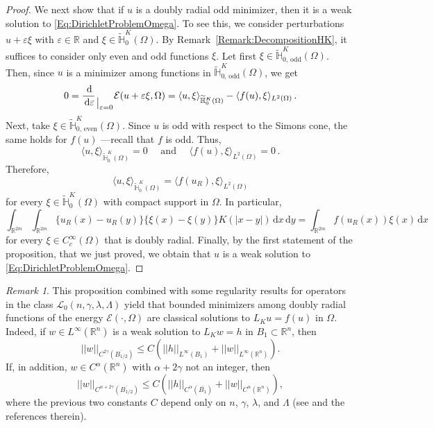 \documentclass[12pt,reqno]{amsart}
\theoremstyle{definition}
\theoremstyle{remark}
\newtheorem{remark}[theorem]{Remark}
\newcommand{\con}[1]{\mathbb{#1}}
\newcommand{\R}{\con{R}} %
\renewcommand{\H}{\con{H}}
\newcommand{\ecal}{\mathcal{E}}
\newcommand{\lcal}{\mathcal{L}}
\newcommand{\norm}[1]{\left | \left |{#1} \right | \right |}
\newcommand{\s}{\gamma}
\renewcommand{\d}{\,\mathrm{d}} %
\newcommand{\bpar}[1]{\left ( {#1}\right )}
\newcommand\evalat[1]{_{\mkern1.5mu\big\vert_{\scriptstyle #1}}}
\numberwithin{equation}{section}
\begin{document}
\begin{proof}
	
	We next show that if $u$ is a doubly radial odd minimizer, then it is a weak solution to \eqref{Eq:DirichletProblemOmega}. To see this, we consider perturbations $u +  \varepsilon \xi$ with $\varepsilon\in \R$ and $\xi \in \widetilde{\H}^K_{0}(\Omega)$. By Remark~\ref{Remark:DecompositionHK}, it suffices to consider only even and odd functions $\xi$. Let first $\xi \in \widetilde{\H}^K_{0, \,\mathrm{odd}}(\Omega)$. Then, since $u$ is a minimizer among functions in $\widetilde{\H}^K_{0, \,\mathrm{odd}}(\Omega)$, we get
	$$
	0 = \dfrac{\d}{\d \varepsilon}\evalat{\varepsilon = 0} \ecal(u +  \varepsilon \xi, \Omega) = \langle u,\xi \rangle_{\widetilde{\H}^K_0(\Omega)} - \langle f(u),\xi \rangle_{L^2(\Omega)}\,.
	$$
	Next, take $\xi \in \widetilde{\H}^K_{0, \,\mathrm{even}}(\Omega)$. Since $u$ is odd with respect to the Simons cone, the same holds for $f(u)$ ---recall that $f$ is odd. Thus,
	$$
	\langle u,\xi \rangle_{\widetilde{\H}^K_0(\Omega)} = 0 \quad \textrm{ and } \quad  \langle f(u),\xi \rangle_{L^2(\Omega)} = 0\,.
	$$
	Therefore, 
	$$
	\langle u,\xi \rangle_{\widetilde{\H}^K_0(\Omega)} = \langle f(u_R),\xi \rangle_{L^2(\Omega)}
	$$
	for every $\xi \in\widetilde{\H}^K_0(\Omega)$ with compact support in  $\Omega$. In particular,
	$$
	\int_{\R^{2m}}\int_{\R^{2m}} \{u_R(x)-u_R(y)\}\{\xi(x)-\xi(y)\} K(|x-y|) \d x \d y = \int_{\R^{2m}} f(u_R(x)) \xi(x) \d x
	$$
	for every $\xi \in C^\infty_c(\Omega)$ that is doubly radial. Finally, by the first statement of the proposition, that we just proved, we obtain that $u$ is a weak solution to \eqref{Eq:DirichletProblemOmega}.
\end{proof}



\begin{remark}
	\label{Remark:InteriorRegularity}
	This proposition combined with some regularity results for operators in the class $\lcal_0(n,\s,\lambda, \Lambda)$ yield that bounded minimizers among doubly radial functions of the energy $\ecal(\cdot,\Omega)$ are classical solutions to $L_K u = f(u)$ in $\Omega$. Indeed, if $w\in L^\infty (\R^n)$ is a weak solution to $L_K w = h$ in $B_1\subset \R^n$, then
	\begin{equation}
	\label{Eq:C2sEstimate}
	\norm{w}_{C^{2\s} (\overline{B_{1/2}})} \leq C\bpar{\norm{h}_{L^\infty (B_1)} + \norm{w}_{L^\infty  (\R^n)}}.
	\end{equation} 
	If, in addition, $w \in C^\alpha (\R^n)$ with $\alpha + 2\s$ not an integer, then
	\begin{equation}
	\label{Eq:Calpha->Calpha+2sEstimate}
	\norm{w}_{C^{\alpha + 2\s} (\overline{B_{1/2}})} \leq C\bpar{\norm{h}_{C^{\alpha} (\overline{B_1})} + \norm{w}_{C^\alpha (\R^n)} },
	\end{equation}
	where the previous two constants $C$ depend only on $n$, $\s$, $\lambda$, and $\Lambda$ (see \cite{RosOton-Survey,SerraC2s+alphaRegularity} and the references therein).
\end{remark}
\end{document}
